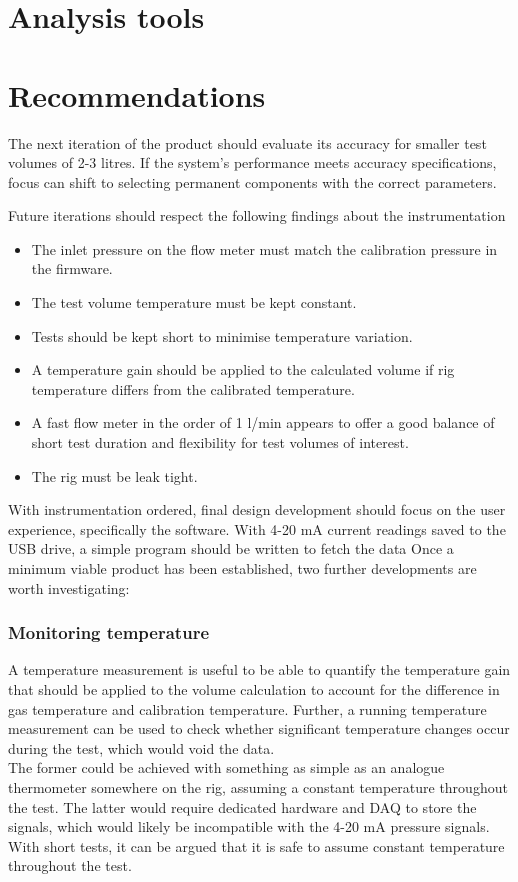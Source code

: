 \documentclass{report}
\begin{document}
\section{Analysis tools}
\section{Recommendations}
The next iteration of the product should evaluate its accuracy for smaller test volumes of 2-3 litres. If the system's performance meets accuracy specifications, focus can shift to selecting permanent components with the correct parameters.

Future iterations should respect the following findings about the instrumentation
\begin{itemize}
	\item The inlet pressure on the flow meter must match the calibration pressure  in the firmware.
	\item The test volume temperature must be kept constant.
	\item Tests should be kept short to minimise temperature variation. 
	\item A temperature gain should be applied to the calculated volume if rig temperature differs from the calibrated temperature.
	\item A fast flow meter in the order of 1 l/min appears to offer a good balance of short test duration and flexibility for test volumes of interest.
	\item The rig must be leak tight.
\end{itemize}	
With instrumentation ordered, final design development should focus on the user experience, specifically the software. With 4-20 mA current readings saved to the USB drive, a simple program should be written to fetch the data 
Once a minimum viable product has been established, two further developments are worth investigating:
\subsubsection{Monitoring temperature} 
A temperature measurement is useful to be able to quantify the temperature gain that should be applied to the volume calculation to account for the difference in gas temperature and calibration temperature. Further, a running temperature measurement can be used to check whether significant temperature changes occur during the test, which would void the data.\\
The former could be achieved with something as simple as an analogue thermometer somewhere on the rig, assuming a constant temperature throughout the test. The latter would require dedicated hardware and DAQ to store the signals, which would likely be incompatible with the 4-20 mA pressure signals. With short tests, it can be argued that it is safe to assume constant temperature throughout the test.
\end{document}
